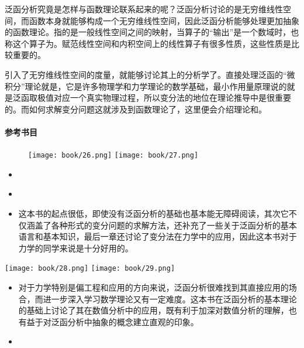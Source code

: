 泛函分析究竟是怎样与函数理论联系起来的呢？泛函分析讨论的是无穷维线性空间，而函数本身就能够构成一个无穷维线性空间，因此泛函分析能够处理更加抽象的函数理论。指的是一般线性空间之间的映射，当算子的“输出”是一个数域时，也称这个算子为。赋范线性空间和内积空间上的线性算子有很多性质，这些性质是比较重要的。

引入了无穷维线性空间的度量，就能够讨论其上的分析学了。直接处理泛函的“微积分”理论就是，它是许多物理学和力学理论的数学基础，最小作用量原理说的就是泛函取极值对应一个真实物理过程，所以变分法的地位在理论推导中是很重要的。而如何求解变分问题这就涉及到函数理论了，这里便会介绍理论和。

\paragraph{参考书目}

\begin{figure}[ht]
    \centering
    \texttt{[image: book/26.png]} \quad
    \texttt{[image: book/27.png]}
\end{figure}

\begin{itemize}
    \item \textcite[应用泛函分析]{薛小平2012应用泛函分析}
    \item \textcite[应用泛函分析]{柳重堪1986}
    \item \textcite[变分法基础]{老大中2015变分法基础}

          这本书的起点很低，即使没有泛函分析的基础也基本能无障碍阅读，其次它不仅涵盖了各种形式的变分问题的求解方法，还补充了一些关于泛函分析的基本语言和基本知识，最后一章还讨论了变分法在力学中的应用，因此这本书对于力学的同学来说是十分好用的。
\end{itemize}
\begin{center}
    \texttt{[image: book/28.png]} \quad
    \texttt{[image: book/29.png]}
\end{center}

\begin{itemize}
    \item \textcite[数值泛函及其应用]{张维强2021}

          对于力学特别是偏工程和应用的方向来说，泛函分析很难找到其直接应用的场合，而进一步深入学习数学理论又有一定难度。这本书在泛函分析的基本理论的基础上讨论了其在数值分析中的应用，既有利于加深对数值分析的理解，也有益于对泛函分析中抽象的概念建立直观的印象。

    \item \textcite[有限元方法的数学理论]{杜其奎2012}
\end{itemize}


